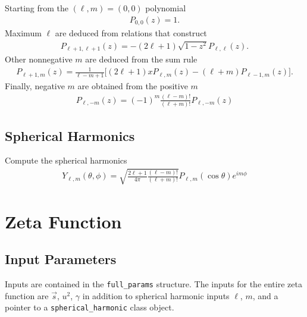 \documentclass[a4paper]{article}
\begin{document}
Starting from the $(\ell,m) = (0,0)$ polynomial
\begin{align}
 P_{0,0}(z) = 1.
\end{align}
Maximum $\ell$ are deduced from relations that construct
\begin{align}
 P_{\ell+1,\ell+1}(z) = -(2\ell+1) \sqrt{1-z^2} P_{\ell,\ell}(z).
\end{align}
Other nonnegative $m$ are deduced from the sum rule
\begin{align}
 P_{\ell+1,m}(z) = \frac{1}{\ell-m+1}
 \Big[ (2\ell+1)x P_{\ell,m}(z) -(\ell+m) P_{\ell-1,m}(z) \Big].
\end{align}
Finally, negative $m$ are obtained from the positive $m$
\begin{align}
 P_{\ell,-m}(z) = (-1)^{m} \frac{(\ell-m)!}{(\ell+m)!} P_{\ell,-m}(z)
\end{align}

\subsection{Spherical Harmonics}

Compute the spherical harmonics
\begin{align}
 Y_{\ell,m}(\theta,\phi)
 = \sqrt{ \frac{2\ell+1}{4\pi} \frac{(\ell-m)!}{(\ell+m)!} }
 P_{\ell,m}(\cos\theta) e^{i m \phi}
\end{align}

\section{Zeta Function}

\subsection{Input Parameters}

Inputs are contained in the {\tt full\_params} structure.
The inputs for the entire zeta function are $\vec{s}$, $u^{2}$, $\gamma$
 in addition to spherical harmonic inputs $\ell$, $m$, and a pointer to a
 {\tt spherical\_harmonic} class object.
\end{document}
